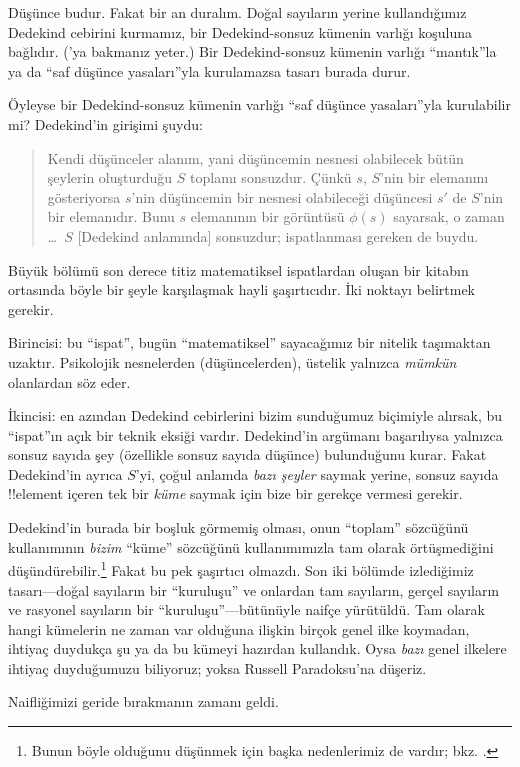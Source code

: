 \documentclass[../../../include/open-logic-section]{subfiles}
\begin{document}
Düşünce budur. Fakat bir an duralım. Doğal sayıların yerine kullandığımız
Dedekind cebirini kurmamız, bir Dedekind-sonsuz kümenin varlığı koşuluna
bağlıdır. ('ya
bakmanız yeter.) Bir Dedekind-sonsuz kümenin varlığı ``mantık''la ya da
``saf düşünce yasaları''yla kurulamazsa tasarı burada durur.

Öyleyse bir Dedekind-sonsuz kümenin varlığı ``saf düşünce yasaları''yla
kurulabilir mi? Dedekind'in girişimi şuydu:
\begin{quote}
  Kendi düşünceler alanım, yani düşüncemin nesnesi olabilecek bütün şeylerin
  oluşturduğu $S$ toplamı sonsuzdur. Çünkü $s$, $S$'nin bir elemanını
  gösteriyorsa $s$'nin düşüncemin bir nesnesi olabileceği düşüncesi $s'$ de
  $S$'nin bir elemanıdır. Bunu $s$ elemanının bir görüntüsü $\phi(s)$
  sayarsak, o zaman \dots~$S$ [Dedekind anlamında] sonsuzdur; ispatlanması
  gereken de buydu.
	\citep[\S66]{Dedekind1888}
\end{quote}
Büyük bölümü son derece titiz matematiksel ispatlardan oluşan bir kitabın
ortasında böyle bir şeyle karşılaşmak hayli şaşırtıcıdır. İki noktayı
belirtmek gerekir.

Birincisi: bu ``ispat'', bugün ``matematiksel'' sayacağımız bir nitelik
taşımaktan uzaktır. Psikolojik nesnelerden (düşüncelerden), üstelik yalnızca
\emph{mümkün} olanlardan söz eder.

İkincisi: en azından Dedekind cebirlerini bizim sunduğumuz biçimiyle
alırsak, bu ``ispat''ın açık bir teknik eksiği vardır. Dedekind'in argümanı
başarılıysa yalnızca sonsuz sayıda şey (özellikle sonsuz sayıda düşünce)
bulunduğunu kurar. Fakat Dedekind'in ayrıca $S$'yi, çoğul anlamda
\emph{bazı şeyler} saymak yerine, sonsuz sayıda !!{element} içeren tek bir
\emph{küme} saymak için bize bir gerekçe vermesi gerekir.

Dedekind'in burada bir boşluk görmemiş olması, onun ``toplam'' sözcüğünü
kullanımının \emph{bizim} ``küme'' sözcüğünü kullanımımızla tam olarak
örtüşmediğini düşündürebilir.\footnote{Bunun böyle olduğunu düşünmek için
başka nedenlerimiz de vardır; bkz. \citet[p.~23]{Potter2004}.} Fakat bu pek
şaşırtıcı olmazdı. Son iki bölümde izlediğimiz tasarı---doğal sayıların bir
``kuruluşu'' ve onlardan tam sayıların, gerçel sayıların ve rasyonel sayıların
bir ``kuruluşu''---bütünüyle naifçe yürütüldü. Tam olarak hangi kümelerin ne
zaman var olduğuna ilişkin birçok genel ilke koymadan, ihtiyaç duydukça şu ya
da bu kümeyi hazırdan kullandık. Oysa \emph{bazı} genel ilkelere ihtiyaç
duyduğumuzu biliyoruz; yoksa Russell Paradoksu'na düşeriz.

Naifliğimizi geride bırakmanın zamanı geldi.
\end{document}
